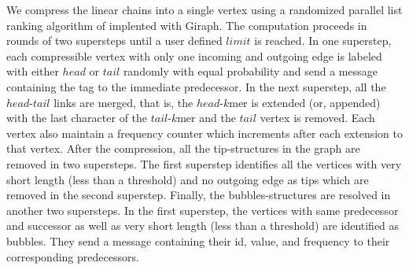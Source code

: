 \documentclass[conference]{IEEEtran}
\begin{document}
We compress the linear chains into a single vertex using a randomized parallel list ranking algorithm of \cite{algo:parallellistrank} implented with Giraph. 
The computation proceeds in rounds of two supersteps until a user defined $limit$ is reached. 
In one superstep, each compressible vertex with only one incoming and outgoing edge is labeled with either $head$ or $tail$ randomly with equal probability and send a message containing the tag to the immediate predecessor. 
In the next superstep, all the $head$-$tail$ links are merged, that is, the $head$-$k$mer is extended (or, appended) with the last character of the $tail$-$k$mer and the $tail$ vertex is removed. 
Each vertex also maintain a frequency counter which increments after each extension to that vertex.
After the compression, all the tip-structures in the graph are removed in two supersteps. 
The first superstep identifies all the vertices with very short length (less than a threshold) and no outgoing edge as tips which are removed in the second superstep.
Finally, the bubbles-structures are resolved in another two supersteps. 
In the first superstep, the vertices with same predecessor and successor as well as very short length (less than a threshold) are identified as bubbles. They send a message containing their id, value, and frequency to their corresponding predecessors. 
\end{document}
